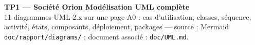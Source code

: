 \documentclass[12pt]{article}
\begin{document}
\noindent
\begin{tcolorbox}[
  enhanced,
  colback=orionblue,
  colframe=orionblue,
  boxrule=0pt,
  arc=3pt,
  left=14pt,right=14pt,top=8pt,bottom=8pt,
  width=\textwidth,
]
{\color{white}\Huge\bfseries TP1 --- Société Orion \hfill Modélisation UML complète}\\[1.5mm]
{\color{orionbg}\large
  11 diagrammes UML 2.x sur une page A0 : cas d'utilisation, classes, séquence, activité,
  états, composants, déploiement, packages ---
  source : Mermaid \texttt{doc/rapport/diagrams/} ; document associé : \texttt{doc/UML.md}.}
\end{tcolorbox}

\vspace{4mm}

\end{document}
